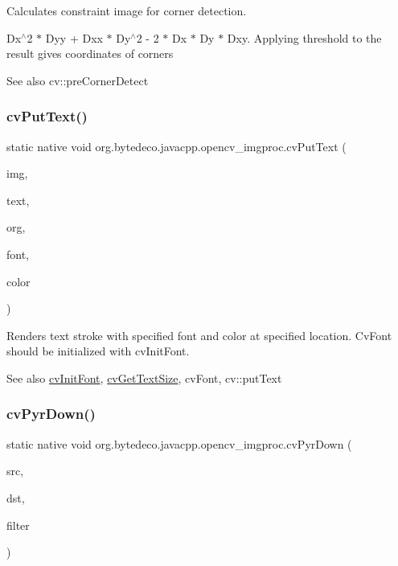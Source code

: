 Calculates constraint image for corner detection. 

Dx$^\wedge$2 $\ast$ Dyy + Dxx $\ast$ Dy$^\wedge$2 -\/ 2 $\ast$ Dx $\ast$ Dy $\ast$ Dxy. Applying threshold to the result gives coordinates of corners \begin{DoxySeeAlso}{See also}
cv\+::pre\+Corner\+Detect 
\end{DoxySeeAlso}
\mbox{\label{group__imgproc__c_gaa0527c4e076b98ec48324b7585ca98df}} 
\subsubsection{\texorpdfstring{cv\+Put\+Text()}{cvPutText()}}
{\footnotesize\ttfamily static native void org.\+bytedeco.\+javacpp.\+opencv\+\_\+imgproc.\+cv\+Put\+Text (\begin{DoxyParamCaption}\item[{Cv\+Arr}]{img,  }\item[{@Cast(\char`\"{}const char$\ast$\char`\"{}) Byte\+Pointer}]{text,  }\item[{@By\+Val Cv\+Point}]{org,  }\item[{@Const Cv\+Font}]{font,  }\item[{@By\+Val Cv\+Scalar}]{color }\end{DoxyParamCaption})\hspace{0.3cm}{\ttfamily [static]}}



Renders text stroke with specified font and color at specified location. Cv\+Font should be initialized with cv\+Init\+Font. 

\begin{DoxySeeAlso}{See also}
\hyperlink{group__imgproc__c_ga7802f35f4ff9683ba622d633d5b17a25}{cv\+Init\+Font}, \hyperlink{group__imgproc__c_gaadcbbe95eaad71798726cedfd442c08f}{cv\+Get\+Text\+Size}, cv\+Font, cv\+::put\+Text 
\end{DoxySeeAlso}
\mbox{\label{group__imgproc__c_ga728d5076e2233678be83cad3203472f9}} 
\subsubsection{\texorpdfstring{cv\+Pyr\+Down()}{cvPyrDown()}}
{\footnotesize\ttfamily static native void org.\+bytedeco.\+javacpp.\+opencv\+\_\+imgproc.\+cv\+Pyr\+Down (\begin{DoxyParamCaption}\item[{@Const Cv\+Arr}]{src,  }\item[{Cv\+Arr}]{dst,  }\item[{int}]{filter }\end{DoxyParamCaption})\hspace{0.3cm}{\ttfamily [static]}}



